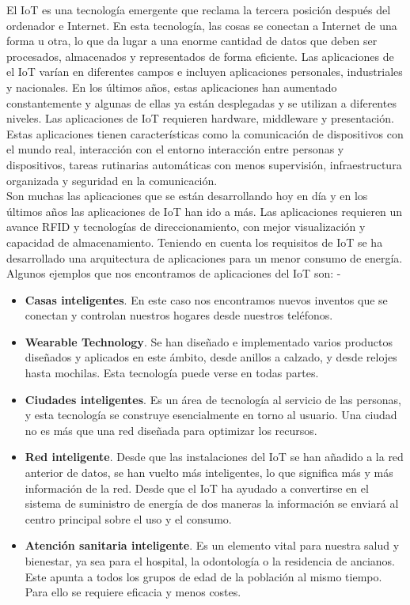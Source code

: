 {El IoT es una tecnología emergente que reclama la tercera posición después del ordenador e Internet. En esta tecnología, las cosas se conectan a Internet de una forma u otra, lo que da lugar a una enorme cantidad de datos que deben ser procesados, almacenados y representados de forma eficiente. Las aplicaciones de el IoT varían en diferentes campos e incluyen aplicaciones personales, industriales y nacionales. En los últimos años, estas aplicaciones han aumentado constantemente y algunas de ellas ya están desplegadas y se utilizan a diferentes niveles. Las aplicaciones de IoT requieren hardware, middleware y presentación. Estas aplicaciones tienen características como la comunicación de dispositivos con el mundo real, interacción con el entorno interacción entre personas y dispositivos, tareas rutinarias automáticas con menos supervisión, infraestructura organizada y seguridad en la comunicación.\\

Son muchas las aplicaciones que se están desarrollando hoy en día y en los últimos años las aplicaciones de IoT han ido a más. Las aplicaciones requieren un avance RFID y tecnologías de direccionamiento, con mejor visualización y capacidad de almacenamiento. Teniendo en cuenta los requisitos de IoT se ha desarrollado una arquitectura de aplicaciones para un menor consumo de energía. Algunos ejemplos que nos encontramos de aplicaciones del IoT son: \cite{8320780}-\cite{tripathy2017internet}

\begin{itemize}
    \item \textbf{Casas inteligentes}. En este caso nos encontramos nuevos inventos que se conectan y controlan nuestros hogares desde nuestros teléfonos.
    \item \textbf{Wearable Technology}. Se han diseñado e implementado varios productos diseñados y aplicados en este ámbito, desde anillos a calzado, y desde relojes hasta mochilas. Esta tecnología puede verse en todas partes.
    \item \textbf{Ciudades inteligentes}. Es un área de tecnología al servicio de las personas, y esta tecnología se construye esencialmente en torno al usuario. Una ciudad no es más que una red diseñada para optimizar los recursos.
    \item \textbf{Red inteligente}. Desde que las instalaciones del IoT se han añadido a la red anterior de datos, se han vuelto más inteligentes, lo que significa más y más información de la red. Desde que el IoT ha ayudado a convertirse en el sistema de suministro de energía de dos maneras la información se enviará al centro principal sobre el uso y el consumo.
    \item \textbf{Atención sanitaria inteligente}. Es un elemento vital para nuestra salud y bienestar, ya sea para el hospital, la odontología o la residencia de ancianos. Este apunta a todos los grupos de edad de la población al mismo tiempo. Para ello se requiere eficacia y menos costes.
\end{itemize}

}

